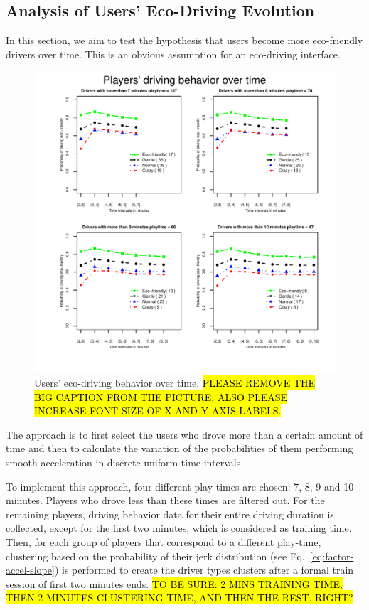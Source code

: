 \documentclass[preprint,authoryear,12pt]{elsarticle}
\begin{document}
\subsection{Analysis of Users' Eco-Driving Evolution}
\label{subsec:eco-friendliness_over_time}

In this section, we aim to test the hypothesis that users become more eco-friendly drivers over time. This is an obvious assumption for an eco-driving interface.

\begin{figure}[!tb]
	\centering
	\includegraphics[width=1\linewidth]{ijhcs14-img/Evolution.pdf}
	\caption{Users' eco-driving behavior over time. \hl{PLEASE REMOVE THE BIG CAPTION FROM THE PICTURE; ALSO PLEASE INCREASE FONT SIZE OF X AND Y AXIS LABELS.}
}
	\label{fig:evolution}
\end{figure}

The approach is to first select the users who drove more than a certain amount of time and then to calculate the variation of the probabilities of them performing smooth acceleration in discrete uniform time-intervals.

To implement this approach, four different play-times are chosen: 7, 8, 9 and 10 minutes. Players who drove less than these times are filtered out. For the remaining players, driving behavior data for their entire driving duration is collected, except for the first two minutes, which is considered as training time.
Then, for each group of players that correspond to a different play-time, clustering based on the probability of their jerk distribution (see Eq.~\ref{eq:factor-accel-slope}) is performed to create the driver types clusters after a formal train session of first two minutes ends. \hl{TO BE SURE: 2 MINS TRAINING TIME, THEN 2 MINUTES CLUSTERING TIME, AND THEN THE REST. RIGHT?}
\end{document}
